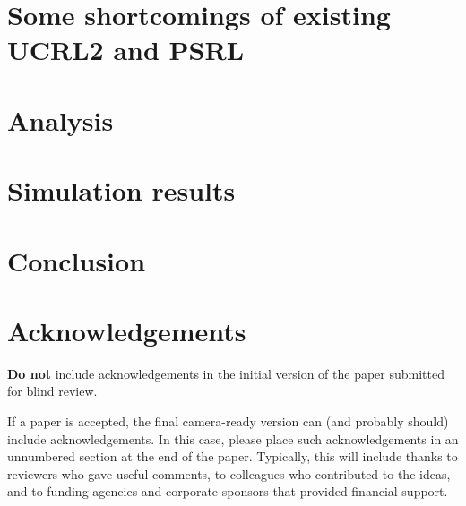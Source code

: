 \documentclass{article}
\begin{document}
    	
		

\section{Some shortcomings of existing UCRL2 and PSRL}

\section{Analysis}

\section{Simulation results}

\section{Conclusion}

\section*{Acknowledgements}

\textbf{Do not} include acknowledgements in the initial version of
the paper submitted for blind review.

If a paper is accepted, the final camera-ready version can (and
probably should) include acknowledgements. In this case, please
place such acknowledgements in an unnumbered section at the
end of the paper. Typically, this will include thanks to reviewers
who gave useful comments, to colleagues who contributed to the ideas,
and to funding agencies and corporate sponsors that provided financial
support.
\end{document}
